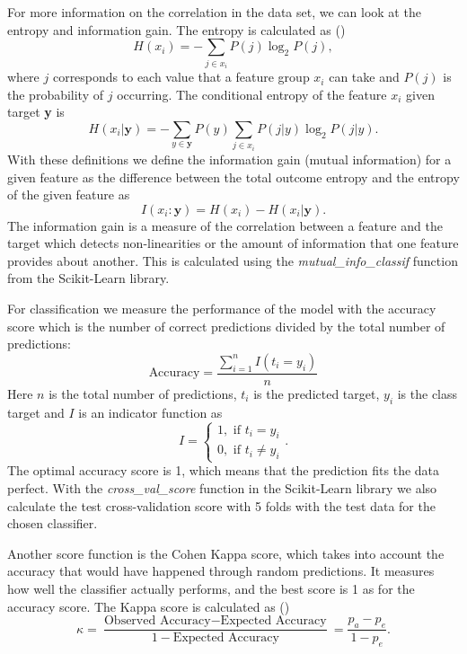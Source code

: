 \documentclass[12pt,a4paper,english]{article}
\begin{document}
For more information on the correlation in the data set, we can look at the entropy and information gain. The entropy is calculated as (\cite{pulsar_art})
\begin{equation*}
H(x_i)=-\sum_{j\in x_i}P(j)\log_2P(j),
\end{equation*}
where $j$ corresponds to each value that a feature group $x_i$ can take and $P(j)$ is the probability of $j$ occurring. The conditional entropy of the feature $x_i$ given target \textbf{y} is 
\begin{equation*}
H(x_i|\textbf{y})=-\sum_{y\in\textbf{y}}P(y)\sum_{j\in x_i}P(j|y)\log_2P(j|y).
\end{equation*} 
With these definitions we define the information gain (mutual information) for a given feature as the difference between the total outcome entropy and the entropy of the given feature as
\begin{equation}
\label{eq:inf_gain}
I(x_i:\textbf{y})=H(x_i)-H(x_i|\textbf{y}).
\end{equation}
The information gain is a measure of the correlation between a feature and the target which detects non-linearities or the amount of information that one feature provides about another. This is calculated using the \textit{mutual\_info\_classif} function from the Scikit-Learn library.

For classification we measure the performance of the model with the accuracy score which is the number of correct predictions divided by the total number of predictions:
\begin{equation}
\label{eq:accuracy}
\text{Accuracy}=\frac{\sum_{i=1}^{n}I(t_i=y_i)}{n}
\end{equation}
Here $n$ is the total number of predictions, $t_i$ is the predicted target, $y_i$ is the class target and $I$ is an indicator function as
\[I=\begin{cases}
1, \text{ if } t_i=y_i\\
0, \text{ if } t_i\neq y_i
\end{cases}.\]
The optimal accuracy score is 1, which means that the prediction fits the data perfect. With the \textit{cross\_val\_score} function in the Scikit-Learn library we also calculate the test cross-validation score with 5 folds with the test data for the chosen classifier.

Another score function is the Cohen Kappa score, which takes into account the accuracy that would have happened through random predictions. It measures how well the classifier actually performs, and the best score is 1 as for the accuracy score. The Kappa score is calculated as (\cite{kappa})
\begin{equation}
\label{eq:kappa}
\kappa=\frac{\text{Observed Accuracy} - \text{Expected Accuracy}}{1-\text{Expected Accuracy}}=\frac{p_a-p_e}{1-p_e}.
\end{equation}
\end{document}
